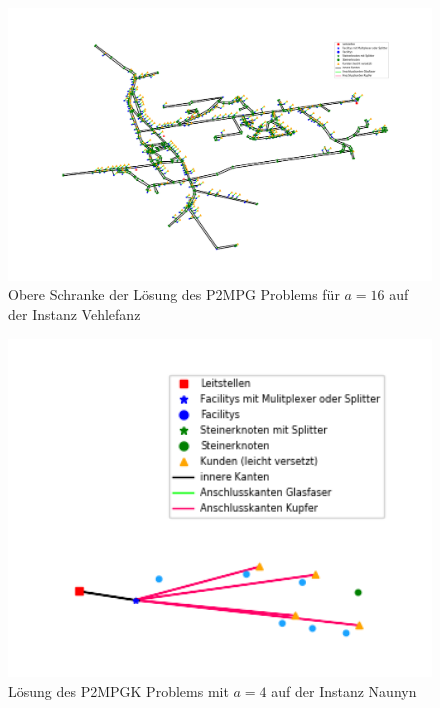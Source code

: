 \documentclass[11pt,a4paper]{article}
\theoremstyle{my_th_style1}
\begin{document}
\begin{figure}[!htbp]
	\begin{center}
		\begin{minipage}{15.0cm}
			\includegraphics[width=1\textwidth]{./Bilder/P2MPG_Vehlefanz_demand1_duration0_SN16_upperbound}
			\caption{Obere Schranke der L\"osung des P2MPG Problems f\"ur \(a=16\) auf der Instanz Vehlefanz}
			\label{p2mpg_v_sn16_pic_ub}
		\end{minipage}
	\end{center}
\end{figure}

\begin{figure}[!htbp]
	\begin{center}
		\begin{minipage}{8.0cm}
			\includegraphics[width=1\textwidth]{./Bilder/P2MPGK_Naunyn_demand1_duration0}
			\caption{L\"osung des P2MPGK Problems mit \(a = 4\) auf der Instanz Naunyn}
			\label{p2mpgk_n_pic_sn4}
		\end{minipage}
	\end{center}
\end{figure}
\end{document}
